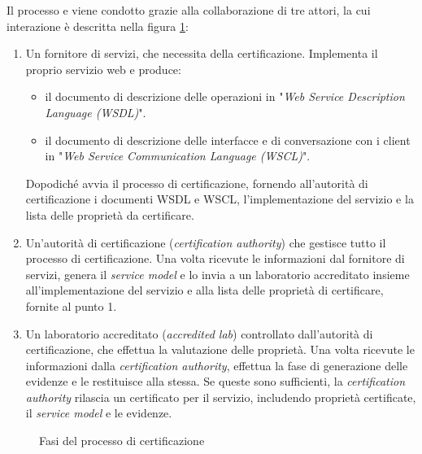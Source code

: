 \documentclass[../main.tex]{subfiles}
\begin{document}
Il processo  e viene condotto grazie alla collaborazione di tre attori, la cui interazione è descritta nella figura \ref{fig:CertSoaFig1b}:
\begin{enumerate}
\item Un fornitore di servizi, che necessita della certificazione. Implementa il proprio servizio web e produce:
\begin{itemize}
\item il documento di descrizione delle operazioni in "\textit{Web Service Description Language (WSDL)}".
\item il documento di descrizione delle interfacce e di conversazione con i client in "\textit{Web Service Communication Language (WSCL)}".
\end{itemize}
Dopodiché avvia il processo di certificazione, fornendo all'autorità di certificazione i documenti WSDL e WSCL, l'implementazione del servizio e la lista delle proprietà da certificare. 
\item Un'autorità di certificazione (\textit{certification authority}) che gestisce tutto il processo di certificazione. Una volta ricevute le informazioni dal fornitore di servizi, genera il \textit{service model} e lo invia a un laboratorio accreditato insieme all'implementazione del servizio e alla lista delle proprietà di certificare, fornite al punto 1.
\item Un laboratorio accreditato (\textit{accredited lab}) controllato dall'autorità di certificazione, che  effettua la valutazione delle proprietà. Una volta ricevute le informazioni dalla \textit{certification authority}, effettua la fase di generazione delle evidenze e le restituisce alla stessa. Se queste sono sufficienti, la \textit{certification authority} rilascia un certificato per il servizio, includendo proprietà certificate, il \textit{service model} e le evidenze.
\end{enumerate}

\begin{figure}[H]
\centering
{}
\caption{Fasi del processo di certificazione \cite{CitCertSoa}}\label{fig:CertSoaFig1b}
\end{figure}
\end{document}
